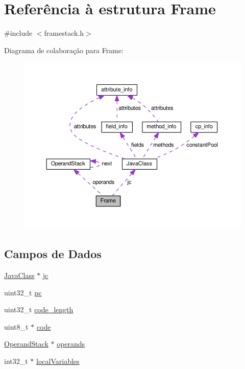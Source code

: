 \hypertarget{structFrame}{}\section{Referência à estrutura Frame}
\label{structFrame}


{\ttfamily \#include $<$framestack.\+h$>$}



Diagrama de colaboração para Frame\+:\nopagebreak
\begin{figure}[H]
\begin{center}
\leavevmode
\includegraphics[width=350pt]{structFrame__coll__graph}
\end{center}
\end{figure}
\subsection*{Campos de Dados}
\begin{DoxyCompactItemize}
\item 
\hyperlink{structJavaClass}{Java\+Class} $\ast$ \hyperlink{structFrame_a6a053c391bc6b65491e72d2fc8ef360f}{jc}
\item 
uint32\+\_\+t \hyperlink{structFrame_a91e50d2091184efb52b6d7c0c21fd4b2}{pc}
\item 
uint32\+\_\+t \hyperlink{structFrame_a33a0dd3a739e1dcfd8b03621c752bb28}{code\+\_\+length}
\item 
uint8\+\_\+t $\ast$ \hyperlink{structFrame_a9de8be272246d00c7a0c2ddc899fe8f2}{code}
\item 
\hyperlink{structOperandStack}{Operand\+Stack} $\ast$ \hyperlink{structFrame_a0be587b8515083ff6d3c4e55918a7657}{operands}
\item 
int32\+\_\+t $\ast$ \hyperlink{structFrame_a9047c9524d44fc81cb6311de8a2a8b77}{local\+Variables}
\end{DoxyCompactItemize}


